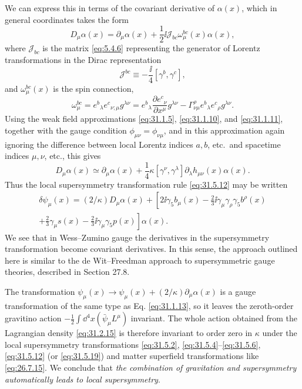 We can express this in terms of the covariant derivative of \(\alpha(x)\),
which in general coordinates takes the form
\begin{equation}
  D_\mu\alpha(x)
  =\partial_\mu\alpha(x)
   +\frac{1}{2}\ii\mathscr{J}_{bc}\omega_\mu^{bc}(x)\alpha(x),
  \tag{31.5.15}\label{eq:31.5.15}
\end{equation}
where \(\mathscr{J}_{bc}\) is the matrix \eqref{eq:5.4.6} representing
the generator of Lorentz transformations in the Dirac representation
\begin{equation}
  \mathscr{J}^{bc}
  \equiv-\frac{\ii}{4}[\gamma^b,\gamma^c],
  \tag{31.5.16}\label{eq:31.5.16}
\end{equation}
and \(\omega_\mu^{bc}(x)\) is the spin connection,
\begin{equation}
  \omega_\mu^{bc}
  =e^b{}_\lambda e^c{}_{\nu;\mu}g^{\lambda\nu}
  =e^b{}_\lambda\frac{\partial e^c{}_\nu}{\partial x^\mu}g^{\lambda\nu}
   -\Gamma^\rho_{\nu\mu}e^b{}_\lambda e^c{}_\rho g^{\lambda\nu}.
  \tag{31.5.17}\label{eq:31.5.17}
\end{equation}
Using the weak field approximations \eqref{eq:31.1.5},
\eqref{eq:31.1.10}, and \eqref{eq:31.1.11}, together with the gauge
condition \(\phi_{\mu\nu}=\phi_{\nu\mu}\), and in this approximation
again ignoring the difference between local Lorentz indices \(a,b\),
etc.\ and spacetime indices \(\mu,\nu\), etc., this gives
\begin{equation}
  D_\mu\alpha(x)
  \simeq\partial_\mu\alpha(x)
  +\frac{1}{4}\kappa[\gamma^\nu,\gamma^\lambda]
    \partial_\lambda h_{\mu\nu}(x)\alpha(x).
  \tag{31.5.18}\label{eq:31.5.18}
\end{equation}
Thus the local supersymmetry transformation rule \eqref{eq:31.5.12} may
be written
\begin{multline}
  \delta\psi_\mu(x)
  =(2/\kappa)D_\mu\alpha(x)
  +\left[
      2\ii\gamma_5b_\mu(x)
      -\frac{2}{3}\ii\gamma_\mu\gamma_\rho\gamma_5b^\rho(x)\right.\\
  \left.
      +\frac{2}{3}\gamma_\mu s(x)
      -\frac{2}{3}\ii\gamma_\mu\gamma_5p(x)
    \right]\alpha(x).
  \tag{31.5.19}\label{eq:31.5.19}
\end{multline}
We see that in Wess--Zumino gauge the derivatives in the supersymmetry
transformation become covariant derivatives. In this sense, the
approach outlined here is similar to the de Wit--Freedman approach to
supersymmetric gauge theories, described in Section 27.8.

The transformation
\(\psi_\mu(x)\longrightarrow\psi_\mu(x)+(2/\kappa)\partial_\mu\alpha(x)\)
is a gauge transformation of the same type as Eq. \eqref{eq:31.1.13},
so it leaves the zeroth-order gravitino action
\(-\frac{1}{2}\int \dd^4x(\bar\psi_\mu L^\mu)\) invariant. The whole action
obtained from the Lagrangian density \eqref{eq:31.2.15} is therefore
invariant to order zero in \(\kappa\) under the local supersymmetry
transformations \eqref{eq:31.5.2}, \eqref{eq:31.5.4}--\eqref{eq:31.5.6},
\eqref{eq:31.5.12} (or \eqref{eq:31.5.19}) and matter superfield
transformations like \eqref{eq:26.7.15}. We conclude that
\emph{the combination of gravitation and supersymmetry automatically
leads to local supersymmetry}.
